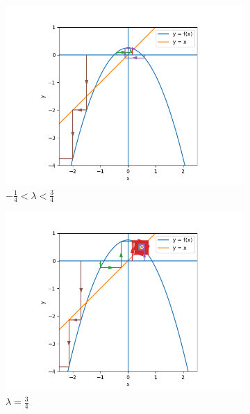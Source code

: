 \documentclass[nonumber]{homework}
\begin{document}
\begin{figure}[h]
\begin{subfigure}{.33\textwidth}
			\includegraphics[width=\linewidth]{3.4c lambda gt -14.png}
			\caption{$-\frac{1}{4} < \lambda < \frac{3}{4}$}
			\label{fig:3.4cgt-14}
		\end{subfigure}
		\begin{subfigure}{.33\textwidth}
			\centering
			\includegraphics[width=\linewidth]{3.4c lambda eq 34.png}
			\caption{$\lambda = \frac{3}{4}$}
			\label{fig:3.4ceq34}
		\end{subfigure}
		\begin{subfigure}{.33\textwidth}
			\centering

\end{subfigure}
\end{figure}
\end{document}
